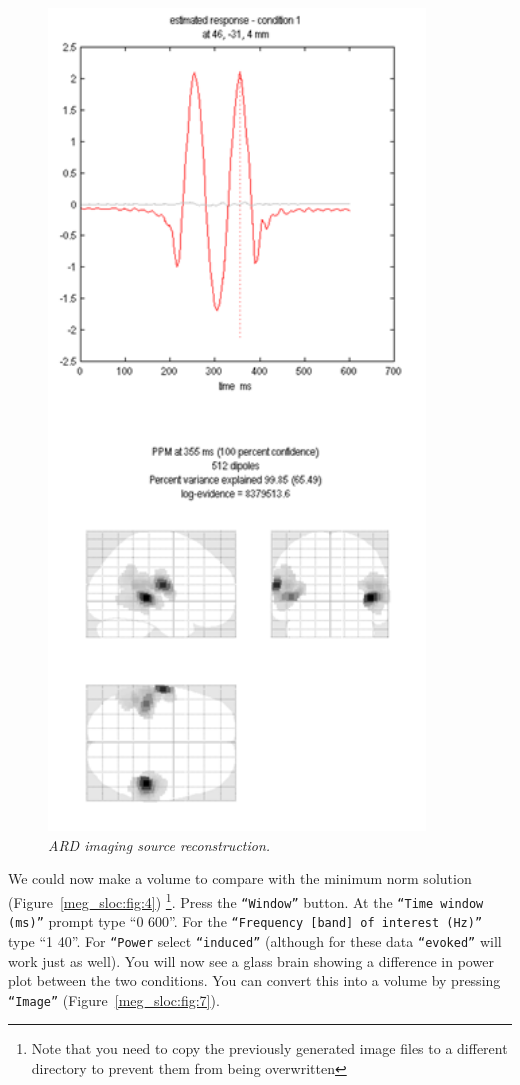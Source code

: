 \begin{figure}
\begin{center}
\includegraphics[width=100mm]{meg_sloc/Slide6}
\caption{\em ARD imaging source reconstruction.\label{meg_sloc:fig:6}}
\end{center}
\end{figure}


We could now make a volume to compare with the minimum norm solution (Figure~\ref{meg_sloc:fig:4}) \footnote{Note that you need to copy the previously generated image files to a different directory to prevent them from being overwritten}. Press the \texttt{``Window''} button. At the \texttt{``Time window (ms)''} prompt type ``0 600''. For the \texttt{``Frequency [band] of interest (Hz)''} type ``1 40''. For \texttt{``Power} select \texttt{``induced''} (although for these data \texttt{``evoked''} will work just as well). You will now see a glass brain showing a difference in power plot between the two conditions. You can convert this into a volume by pressing \texttt{``Image''} (Figure~\ref{meg_sloc:fig:7}).

